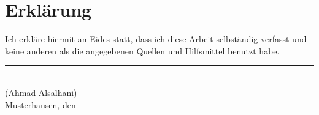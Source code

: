 
\cleardoublepage
\thispagestyle{plain}
\vspace*{\fill}

\section*{Erklärung}

Ich erkläre hiermit an Eides statt, dass ich diese Arbeit selbständig verfasst und keine
anderen als die angegebenen Quellen und Hilfsmittel benutzt habe.

\vskip2cm

\rule{5cm}{0.4pt}\\
(Ahmad Alsalhani)\\
Musterhausen, den \duedate